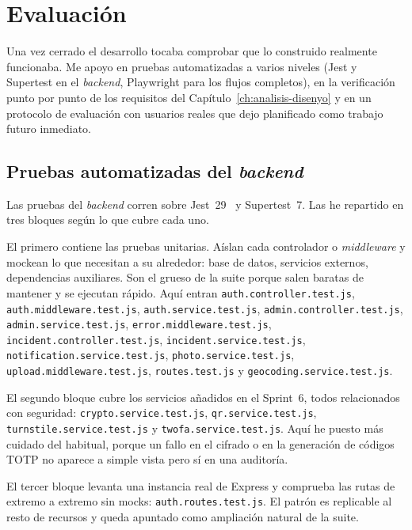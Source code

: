 \chapter{Evaluación}
\label{ch:evaluacion}

Una vez cerrado el desarrollo tocaba comprobar que lo construido realmente funcionaba. Me apoyo en pruebas automatizadas a varios niveles (Jest y Supertest en el \textit{backend}, Playwright para los flujos completos), en la verificación punto por punto de los requisitos del Capítulo~\ref{ch:analisis-disenyo} y en un protocolo de evaluación con usuarios reales que dejo planificado como trabajo futuro inmediato.


\section{Pruebas automatizadas del \textit{backend}}
\label{sec:tests-backend}

Las pruebas del \textit{backend} corren sobre Jest~29~\parencite{jest} y Supertest~7. Las he repartido en tres bloques según lo que cubre cada uno.

El primero contiene las pruebas unitarias. Aíslan cada controlador o \textit{middleware} y mockean lo que necesitan a su alrededor: base de datos, servicios externos, dependencias auxiliares. Son el grueso de la suite porque salen baratas de mantener y se ejecutan rápido. Aquí entran \texttt{auth.controller.test.js}, \texttt{auth.middleware.test.js}, \texttt{auth.service.test.js}, \texttt{admin.controller.test.js}, \texttt{admin.service.test.js}, \texttt{error.middleware.test.js}, \texttt{incident.controller.test.js}, \texttt{incident.service.test.js}, \texttt{notification.service.test.js}, \texttt{photo.service.test.js}, \texttt{upload.middleware.test.js}, \texttt{routes.test.js} y \texttt{geocoding.service.test.js}.

El segundo bloque cubre los servicios añadidos en el Sprint~6, todos relacionados con seguridad: \texttt{crypto.service.test.js}, \texttt{qr.service.test.js}, \texttt{turnstile.service.test.js} y \texttt{twofa.service.test.js}. Aquí he puesto más cuidado del habitual, porque un fallo en el cifrado o en la generación de códigos TOTP no aparece a simple vista pero sí en una auditoría.

El tercer bloque levanta una instancia real de Express y comprueba las rutas de extremo a extremo sin mocks: \texttt{auth.routes.test.js}. El patrón es replicable al resto de recursos y queda apuntado como ampliación natural de la suite.

